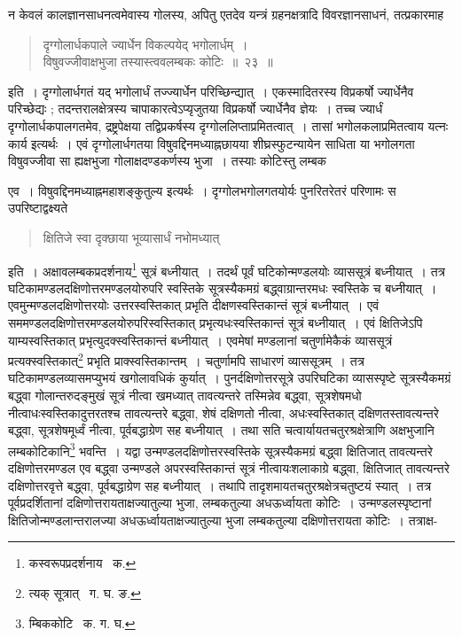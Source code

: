 \documentclass[11pt, openany]{book}
\begin{document}
\indent न केवलं कालज्ञानसाधनत्वमेवास्य गोलस्य, अपितु एतदेव यन्त्रं ग्रहनक्षत्रादि विवरज्ञानसाधनं, तत्प्रकारमाह\textendash 
\begin{quote}
{\ab दृग्गोलार्धकपाले ज्यार्धेन विकल्पयेद् भगोलार्धम्~। \\
 विषुवज्जीवाक्षभुजा तस्यास्त्ववलम्बकः कोटिः~॥~२३~॥} 
\end{quote}

\indent इति~। दृग्गोलार्धगतं यद् भगोलार्धं तज्ज्यार्धेन परिच्छिन्द्यात्~। एकस्मादितरस्य विप्रकर्षो ज्यार्धेनैव परिच्छेद्यः ; तदन्तरालक्षेत्रस्य चापाकारत्वेऽप्यृजुतया विप्रकर्षो ज्यार्धेनैव ज्ञेयः~। तच्च ज्यार्धं दृग्गोलार्धकपालगतमेव, द्रष्ट्रपेक्षया तद्विप्रकर्षस्य दृग्गोललिप्ताप्रमितत्वात्~। तासां भगोलकलाप्रमितत्वाय यत्नः कार्य इत्यर्थः~। एवं दृग्गोलार्धगतया विषुवद्दिनमध्याह्नछायया शीघ्रस्फुटन्यायेन साधिता या भगोलगता विषुवज्जीवा सा ह्यक्षभुजा गोलाक्षदण्डकर्णस्य भुजा~। तस्याः कोटिस्तु लम्बक 

\newpage

\noindent एव~। विषुवद्दिनमध्याह्नमहाशङ्कुतुल्य इत्यर्थः~। दृग्गोलभगोलगतयोर्यः पुनरितरेतरं परिणामः स उपरिष्टाद्वक्ष्यते\textendash 

\begin{quote} 
{\qt क्षितिजे स्वा दृक्छाया भूव्यासार्धं नभोमध्यात्} 
\end{quote}  

\indent इति~। अक्षावलम्बकप्रदर्शनाय\renewcommand{\thefootnote}{१}\footnote{कस्वरूपप्रदर्शनाय \textendash\ क.} सूत्रं बध्नीयात्~। तदर्थं पूर्वं घटिकोन्मण्डलयोः व्याससूत्रं बध्नीयात्~। तत्र घटिकामण्डलदक्षिणोत्तरमण्डलयोरुपरि स्वस्तिके सूत्रस्यैकमग्रं बद्ध्वाग्रान्तरमधः स्वस्तिके च बध्नीयात्~। एवमुन्मण्डलदक्षिणोत्तरयोः उत्तरस्वस्तिकात् प्रभृति दीक्षणस्वस्तिकान्तं सूत्रं बध्नीयात्~। एवं सममण्डलदक्षिणोत्तरमण्डलयोरुपरिस्वस्तिकात् प्रभृत्यधःस्वस्तिकान्तं सूत्रं बध्नीयात्~। एवं क्षितिजेऽपि याम्यस्वस्तिकात् प्रभृत्युदक्स्वस्तिकान्तं बध्नीयात्~। एवमेषां मण्डलानां चतुर्णामेकैकं व्याससूत्रं प्रत्यक्स्वस्तिकात्\renewcommand{\thefootnote}{२}\footnote{त्यक् सूत्रात् \textendash\ ग. घ. ङ.} प्रभृति प्राक्स्वस्तिकान्तम्~। चतुर्णामपि साधारणं व्याससूत्रम्~। तत्र घटिकामण्डलव्यासमप्युभयं खगोलावधिकं कुर्यात्~। पुनर्दक्षिणोत्तरसूत्रे उपरिघटिका व्यासस्पृष्टे सूत्रस्यैकमग्रं बद्ध्वा गोलान्तरुदङ्मुखं सूत्रं नीत्वा खमध्यात् तावत्यन्तरे तस्मिन्नेव बद्ध्वा, सूत्रशेषमधो नीत्वाधःस्वस्तिकादुत्तरतश्च तावत्यन्तरे बद्ध्वा, शेषं दक्षिणतो नीत्वा, अधःस्वस्तिकात् दक्षिणतस्तावत्यन्तरे बद्ध्वा, सूत्रशेषमूर्ध्वं नीत्वा, पूर्वबद्धाग्रेण सह बध्नीयात्~। तथा सति चत्वार्यायतचतुरश्रक्षेत्राणि अक्षभुजानि लम्बकोटिकानि\renewcommand{\thefootnote}{३}\footnote{म्बिककोटि \textendash\ क. ग. घ.} भवन्ति~। यद्वा उन्मण्डलदक्षिणोत्तरस्वस्तिके सूत्रस्यैकमग्रं बद्ध्वा क्षितिजात् तावत्यन्तरे दक्षिणोत्तरमण्डल एव बद्ध्वा उन्मण्डले अपरस्वस्तिकान्तं सूत्रं नीत्वायःशलाकाग्रे बद्ध्वा, क्षितिजात् तावत्यन्तरे दक्षिणोत्तरवृत्ते बद्ध्वा, पूर्वबद्धाग्रेण सह बध्नीयात्~। तथापि तादृशमायतचतुरश्रक्षेत्रचतुष्टयं स्यात्~। तत्र पूर्वप्रदर्शितानां दक्षिणोत्तरायताक्षज्यातुल्या भुजा, लम्बकतुल्या अधऊर्ध्वायता कोटिः~। उन्मण्डलस्पृष्टानां क्षितिजोन्मण्डलान्तरालज्या अधऊर्ध्वायताक्षज्यातुल्या भुजा लम्बकतुल्या दक्षिणोत्तरायता कोटिः~। तत्राक्ष- 
\end{document}
